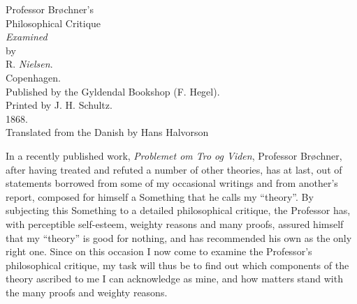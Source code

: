 \documentclass[12pt]{book}
\newcommand{\opage}[1]{\marginnote{\footnotesize\textit{[#1]}}}
\begin{document}
\frontmatter
\begin{titlepage}
\centering
\vspace*{3cm}
{\Large Professor Brøchner's}\\[1em]
{\Huge Philosophical Critique}\\[2em]
{\large \emph{Examined}}\\[1.5em]
{\small by}\\[1.5em]
{\large R. \emph{Nielsen}.}\\[5em]
Copenhagen.\\[0.5em]
Published by the Gyldendal Bookshop (F. Hegel).\\[0.3em]
{\footnotesize Printed by J. H. Schultz.}\\[0.5em]
1868.\\[3em]
{\small Translated from the Danish by Hans Halvorson}
\end{titlepage}

\mainmatter

\opage{3}\setcounter{footnote}{0}%
In a recently published work, \emph{Problemet om Tro og Viden}, Professor
Brøchner, after having treated and refuted a number of other theories, has
at last, out of statements borrowed from some of my occasional writings and
from another's report, composed for himself a Something that he calls my
``theory''. By subjecting this Something to a detailed philosophical
critique, the Professor has, with perceptible self-esteem, weighty reasons
and many proofs, assured himself that my ``theory'' is good for nothing, and
has recommended his own as the only right one. Since on this occasion I now
come to examine the Professor's philosophical critique, my task will thus be
to find out which components of the theory ascribed to me I can acknowledge
as mine, and how matters stand with the many proofs and weighty reasons.
\end{document}
